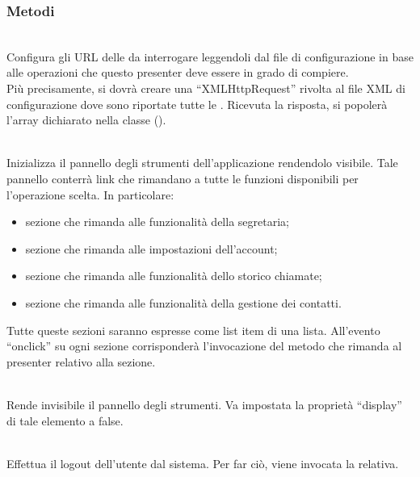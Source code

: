 \subsubsection*{Metodi}
\begin{description}
\item{}\\
Configura gli URL delle  da interrogare leggendoli dal file di configurazione in base alle operazioni che questo presenter deve essere in grado di compiere.\\
Più precisamente, si dovrà creare una ``XMLHttpRequest'' rivolta al file XML di configurazione dove sono riportate tutte le . Ricevuta la risposta, si popolerà l'array dichiarato nella classe ().

\item{}\\
Inizializza il pannello degli strumenti dell'applicazione rendendolo visibile. Tale pannello conterrà link che rimandano a tutte le funzioni disponibili per l'operazione scelta. In particolare:
\begin{itemize}
\item sezione che rimanda alle funzionalità della segretaria;
\item sezione che rimanda alle impostazioni dell'account;
\item sezione che rimanda alle funzionalità dello storico chiamate;
\item sezione che rimanda alle funzionalità della gestione dei contatti.
\end{itemize}
Tutte queste sezioni saranno espresse come list item di una lista. All'evento ``onclick'' su ogni sezione corrisponderà l'invocazione del metodo che rimanda al presenter relativo alla sezione.

\item{}\\
Rende invisibile il pannello degli strumenti. Va impostata la proprietà ``display'' di tale elemento a false.

\item{}\\
Effettua il logout dell'utente dal sistema. Per far ciò, viene invocata la  relativa.

\end{description}



